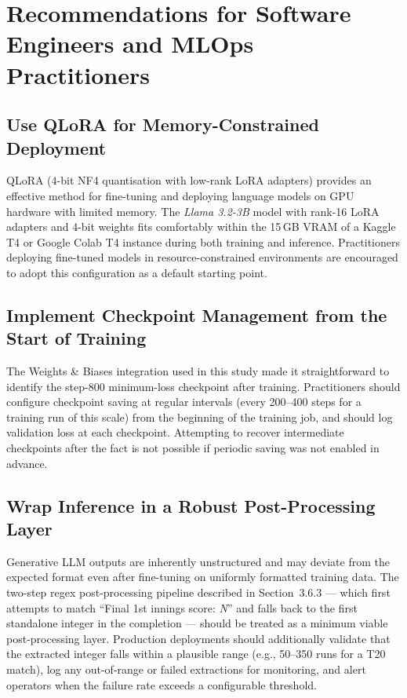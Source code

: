 \section{Recommendations for Software Engineers and MLOps Practitioners}

\subsection{Use QLoRA for Memory-Constrained Deployment}

QLoRA (4-bit NF4 quantisation with low-rank LoRA adapters) provides an effective method for fine-tuning and deploying language models on GPU hardware with limited memory. The \textit{Llama 3.2-3B} model with rank-16 LoRA adapters and 4-bit weights fits comfortably within the 15\,GB VRAM of a Kaggle T4 or Google Colab T4 instance during both training and inference. Practitioners deploying fine-tuned models in resource-constrained environments are encouraged to adopt this configuration as a default starting point.

\subsection{Implement Checkpoint Management from the Start of Training}

The Weights \& Biases integration used in this study made it straightforward to identify the step-800 minimum-loss checkpoint after training. Practitioners should configure checkpoint saving at regular intervals (every 200--400 steps for a training run of this scale) from the beginning of the training job, and should log validation loss at each checkpoint. Attempting to recover intermediate checkpoints after the fact is not possible if periodic saving was not enabled in advance.

\subsection{Wrap Inference in a Robust Post-Processing Layer}

Generative LLM outputs are inherently unstructured and may deviate from the expected format even after fine-tuning on uniformly formatted training data. The two-step regex post-processing pipeline described in Section~3.6.3 --- which first attempts to match ``Final 1st innings score: \textit{N}'' and falls back to the first standalone integer in the completion --- should be treated as a minimum viable post-processing layer. Production deployments should additionally validate that the extracted integer falls within a plausible range (e.g., 50--350 runs for a T20 match), log any out-of-range or failed extractions for monitoring, and alert operators when the failure rate exceeds a configurable threshold.


